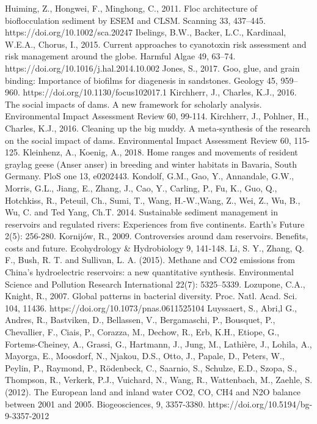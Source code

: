 \begin{thebibliography}{}
Huiming, Z., Hongwei, F., Minghong, C., 2011. Floc architecture of bioflocculation sediment by ESEM and CLSM. Scanning 33, 437–445. https://doi.org/10.1002/sca.20247
Ibelings, B.W., Backer, L.C., Kardinaal, W.E.A., Chorus, I., 2015. Current approaches to cyanotoxin risk assessment and risk management around the globe. Harmful Algae 49, 63–74. https://doi.org/10.1016/j.hal.2014.10.002
Jones, S., 2017. Goo, glue, and grain binding: Importance of biofilms for diagenesis in sandstones. Geology 45, 959–960. https://doi.org/10.1130/focus102017.1
Kirchherr, J., Charles, K.J., 2016. The social impacts of dams. A new framework for scholarly analysis. Environmental Impact Assessment Review 60, 99-114.
Kirchherr, J., Pohlner, H., Charles, K.J., 2016. Cleaning up the big muddy. A meta-synthesis of the research on the social impact of dams. Environmental Impact Assessment Review 60, 115-125.
Kleinhenz, A., Koenig, A., 2018. Home ranges and movements of resident graylag geese (Anser anser) in breeding and winter habitats in Bavaria, South Germany. PloS one 13, e0202443.
Kondolf, G.M., Gao, Y., Annandale, G.W., Morris, G.L., Jiang, E.,  Zhang, J., Cao, Y., Carling, P., Fu, K., Guo, Q., Hotchkiss, R.,  Peteuil, Ch., Sumi, T., Wang, H.-W.,Wang, Z., Wei, Z., Wu, B.,  Wu, C. and  Ted Yang, Ch.T. 2014. Sustainable sediment management in reservoirs and regulated rivers: Experiences from five continents. Earth’s Future 2(5): 256-280.
Kornijów, R., 2009. Controversies around dam reservoirs. Benefits, costs and future. Ecohydrology & Hydrobiology 9, 141-148.
Li, S. Y., Zhang, Q. F., Bush, R. T. and Sullivan, L. A. (2015). Methane and CO2 emissions from China's hydroelectric reservoirs: a new quantitative synthesis. Environmental Science and Pollution Research International 22(7): 5325–5339.
Lozupone, C.A., Knight, R., 2007. Global patterns in bacterial diversity. Proc. Natl. Acad. Sci. 104, 11436. https://doi.org/10.1073/pnas.0611525104
Luyssaert, S., Abri,l G., Andres, R., Bastviken, D., Bellassen, V., Bergamaschi, P., Bousquet, P., Chevallier, F., Ciais, P., Corazza, M., Dechow, R., Erb, K.H., Etiope, G., Fortems-Cheiney, A., Grassi, G., Hartmann, J., Jung, M., Lathière, J., Lohila, A., Mayorga, E., Moosdorf, N., Njakou, D.S., Otto, J., Papale, D., Peters, W., Peylin, P., Raymond, P., Rödenbeck, C., Saarnio, S., Schulze, E.D., Szopa, S., Thompson, R., Verkerk, P.J., Vuichard, N., Wang, R., Wattenbach, M., Zaehle, S. (2012). The European land and inland water CO2, CO, CH4 and N2O balance between 2001 and 2005. Biogeosciences, 9, 3357-3380. https://doi.org/10.5194/bg-9-3357-2012

\end{thebibliography}
